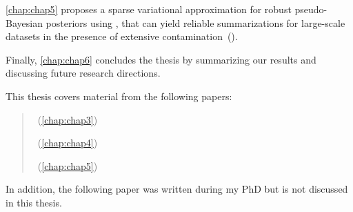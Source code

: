 \cref{chap:chap5} proposes a sparse variational approximation for robust pseudo-Bayesian posteriors using \bdiv, that can yield reliable summarizations for large-scale datasets in the presence of extensive contamination~(\bcores). 

Finally, \cref{chap:chap6} concludes the thesis by summarizing our results and discussing future research directions.


This thesis covers material from the following papers:

\begin{quote}
	~(\cref{chap:chap3})
	
	~(\cref{chap:chap4})
	
	~(\cref{chap:chap5})
\end{quote}


In addition, the following paper was written during my PhD but is not discussed in this thesis.

\begin{quote}
\end{quote}

